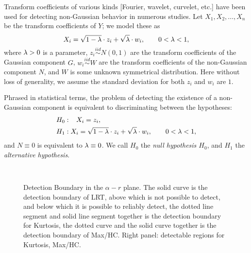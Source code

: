 Transform coefficients of various kinds [Fourier, wavelet, curvelet, etc.] have been used for detecting non-Gaussian behavior 
in numerous studies. Let $X_1, X_2, \ldots, X_n$ be the transform coefficients of $Y$; we model these as  
\begin{equation}    
\label{EqAlt}
X_i = \sqrt{1 - \lambda} \cdot  z_i + \sqrt{\lambda} \cdot w_i,  \qquad 0< \lambda < 1, 
\end{equation}
where $\lambda >0$ is a parameter, $z_i \stackrel{iid}{\sim} N(0,1)$ are the transform coefficients of the Gaussian component $G$, 
$w_i \stackrel{iid}{\sim} W$ are the transform coefficients of the non-Gaussian component $N$, and $W$ is some unknown symmetrical 
distribution. Here without loss of generality, we assume the standard deviation for both $z_i$ and $w_i$ are $1$. 

Phrased in statistical terms, the problem of detecting the existence of a non-Gaussian component is equivalent to discriminating between the hypotheses:  
\begin{align}
&H_0: \;\;\;   X_i = z_i,  \label{EqHypo1}   \\
&H_1:   X_i = \sqrt{1 - \lambda } \cdot z_i  + \sqrt{\lambda} \cdot  w_i,   \qquad 0 < \lambda < 1,   \label{EqHypo2}
\end{align}
and $N \equiv 0$ is equivalent to $\lambda \equiv 0$. We call $H_0$ the {\it null hypothesis $H_0$}, and $H_1$ the {\it alternative hypothesis}. 


\begin{figure}[htb]
\centerline{
\hbox{
 }}
\caption{Detection Boundary in the $\alpha-r$ plane. The solid curve is the detection boundary of LRT, above which is not possible to detect, 
and below which it is possible to reliably detect, the dotted line segment and solid line segment together is the detection boundary for Kurtosis, 
the dotted curve and the solid curve together is the detection boundary of Max/HC. Right panel: detectable regions for Kurtosis, Max/HC.}
\label{Figure:Detect}
\end{figure}

